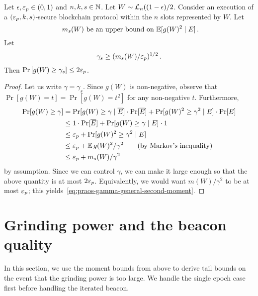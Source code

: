 \begin{lemma}\label{lemma:praos-tail-gamma}
  Let $\epsilon, \mathsf{\varepsilon}_p \in (0, 1)$ and $n, k, s \in \mathbb{N}$. 
  Let $W \sim \mathcal{L}_n((1-\epsilon)/2$.
  Consider an execution of a $(\mathsf{\varepsilon}_p, k, s)$-secure blockchain protocol within
  the $n$ slots represented by $W$. 
  Let 
  $$
    \text{ $m_s(W)$ be an upper bound on $\operatorname{\mathbb{E}}[ g(W)^2 \mid E]$}\,.
  $$
  Let 
  \begin{equation}\label{eq:praos-gamma-general-second-moment}
    \gamma_s \geq (m_s(W)/\mathsf{\varepsilon}_p)^{1/2}
    \,.
  \end{equation}
  Then 
  $
      \Pr\left[g(W) \geq \gamma_s \right] \leq 2 \mathsf{\varepsilon}_p
  $.
\end{lemma}
\begin{proof}
  Let us write $\gamma = \gamma_s$.
  Since $g(W)$ is non-negative, observe that 
  $\Pr[g(W) = t] = \Pr[g(W) = t^2]$ for any non-negative $t$. 
  Furthermore, 
  \begin{align*}
    \Pr[g(W) \geq \gamma]
    &= \Pr[g(W) \geq \gamma \mid \overline{E}] \cdot \Pr[\overline{E}] 
      + \Pr[g(W)^2 \geq \gamma^2 \mid E] \cdot \Pr[E]\\
    &\leq 1 \cdot \Pr[\overline{E}] + \Pr[g(W) \geq \gamma \mid E] \cdot 1 \\
    &\leq \mathsf{\varepsilon}_p + \Pr[g(W)^2 \geq \gamma^2 \mid E] \\
    &\leq \mathsf{\varepsilon}_p + \operatorname{\mathbb{E}} g(W)^2/\gamma^2 \qquad \text{(by Markov's inequality)} \\
    &\leq \mathsf{\varepsilon}_p + m_s(W)/\gamma^2 
  \end{align*}
  by assumption. Since we can control $\gamma$,
  we can make it large enough so that the above quantity is at most $2 \mathsf{\varepsilon}_p$. 
  Equivalently, we would want 
  $m(W)/\gamma^2$ to be at most $\mathsf{\varepsilon}_p$; 
  this yields~\eqref{eq:praos-gamma-general-second-moment}. 
\end{proof}


\section{Grinding power and the beacon quality}
In this section, 
we use the moment bounds from above to derive tail bounds 
on the event that the grinding power is too large. 
We handle the single epoch case first before handling the iterated beacon.

